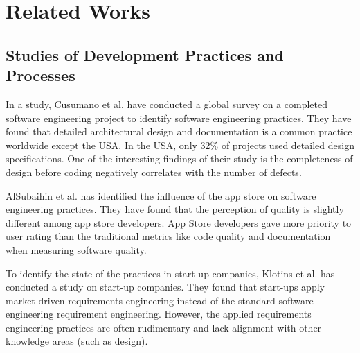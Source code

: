 \section{Related Works}
\label{related_works}

\subsection{Studies of Development Practices and Processes}
\label{dev practice study}
In a study, Cusumano et al.\cite{Cusumano2003} have conducted a global survey on a completed software engineering project to identify software engineering practices. They have found that detailed architectural design and documentation is a common practice worldwide except the USA. In the USA, only 32\% of projects used detailed design specifications. One of the interesting findings of their study is the completeness of design before coding negatively correlates with the number of defects.

AlSubaihin et al.\cite{AlSubaihin2019} has identified the influence of the app store on software engineering practices. They have found that the perception of quality is slightly different among app store developers. App Store developers gave more priority to user rating than the traditional metrics like code quality and documentation when measuring software quality.

To identify the state of the practices in start-up companies, Klotins et al.\cite{Klotins2018} has conducted a study on start-up companies. They found that start-ups apply market-driven requirements engineering instead of the standard software engineering requirement engineering. However,  the applied requirements engineering practices are often rudimentary and lack alignment with other knowledge areas (such as design).

